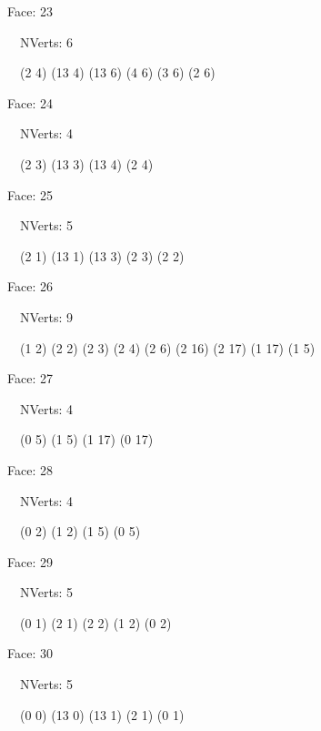 \documentclass{article}
\begin{document}
{\footnotesize 

Face: 23

\   \    NVerts: 6

 \   \   (2 4) (13 4) (13 6) (4 6) (3 6) (2 6)}

{\footnotesize 

Face: 24

\   \    NVerts: 4

 \   \   (2 3) (13 3) (13 4) (2 4)}

{\footnotesize 

Face: 25

\   \    NVerts: 5

 \   \   (2 1) (13 1) (13 3) (2 3) (2 2)}

{\footnotesize 

Face: 26

\   \    NVerts: 9

 \   \   (1 2) (2 2) (2 3) (2 4) (2 6) (2 16) (2 17) (1 17) (1 5)}

{\footnotesize 

Face: 27

\   \    NVerts: 4

 \   \   (0 5) (1 5) (1 17) (0 17)}

{\footnotesize 

Face: 28

\   \    NVerts: 4

 \   \   (0 2) (1 2) (1 5) (0 5)}

{\footnotesize 

Face: 29

\   \    NVerts: 5

 \   \   (0 1) (2 1) (2 2) (1 2) (0 2)}

{\footnotesize 

Face: 30

\   \    NVerts: 5

 \   \   (0 0) (13 0) (13 1) (2 1) (0 1)}


 \newpage
\end{document}
